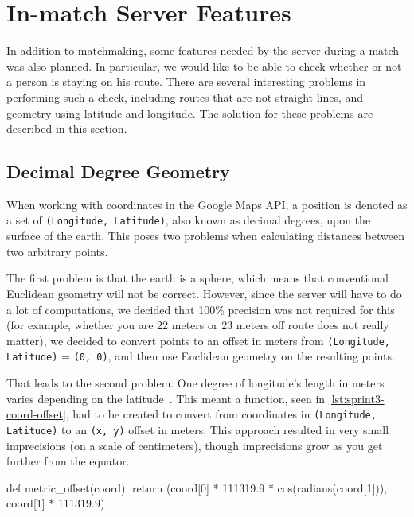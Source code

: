 \section{In-match Server Features}
\label{sec:sprint3-gameserver}

In addition to matchmaking, some features needed by the server during a match was also planned. In particular, we would like to be able to check whether or not a person is staying on his route. There are several interesting problems in performing such a check, including routes that are not straight lines, and geometry using latitude and longitude. The solution for these problems are described in this section.

\subsection{Decimal Degree Geometry}
When working with coordinates in the Google Maps \ac{API}, a position is denoted as a set of \texttt{(Longitude, Latitude)}, also known as decimal degrees, upon the surface of the earth. This poses two problems when calculating distances between two arbitrary points.

The first problem is that the earth is a sphere, which means that conventional Euclidean geometry will not be correct. However, since the server will have to do a lot of computations, we decided that 100\% precision was not required for this (for example, whether you are 22 meters or 23 meters off route does not really matter), we decided to convert points to an offset in meters from \texttt{(Longitude, Latitude)} = \texttt{(0, 0)}, and then use Euclidean geometry on the resulting points.

That leads to the second problem. One degree of longitude's length in meters varies depending on the latitude~\citep{wikidecimaldegrees}. This meant a function, seen in \autoref{lst:sprint3-coord-offset}, had to be created to convert from coordinates in \texttt{(Longitude, Latitude)} to an \texttt{(x, y)} offset in meters. This approach resulted in very small imprecisions (on a scale of centimeters), though imprecisions grow as you get further from the equator.

\begin{code}[label={lst:sprint3-coord-offset}, caption={Convert Decimal Degrees to Offset in Meters}, language={Python}]
def metric_offset(coord):
	return (coord[0] * 111319.9 * cos(radians(coord[1])), coord[1] * 111319.9)
\end{code}

